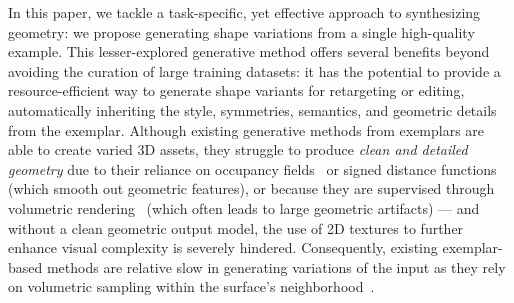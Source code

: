In this paper, 
we tackle a task-specific, yet effective approach to synthesizing geometry: we propose generating shape variations from a single high-quality example. This lesser-explored generative method offers several benefits beyond avoiding the curation of large training datasets: it has the potential to provide a resource-efficient way to generate shape variants for retargeting or editing, automatically inheriting the style, symmetries, semantics, and geometric details from the exemplar.
Although existing generative methods from exemplars are able to create varied 3D assets, they struggle to produce \emph{clean and detailed geometry} due to their reliance on occupancy fields~\cite{wu2022learning, li2023patch, son2023singraf} or signed distance functions~\cite{wu2024sindm} (which smooth out geometric features), or because they are supervised through volumetric rendering~\cite{li2023patch,son2023singraf} (which often leads to large geometric artifacts) --- and without a clean geometric output model, the use of 2D textures to further enhance visual complexity is severely hindered. Consequently, existing exemplar-based methods are relative slow in generating variations of the input as they rely on volumetric sampling within the surface's neighborhood~\cite{wu2022learning,son2023singraf,wu2024sindm}. 
